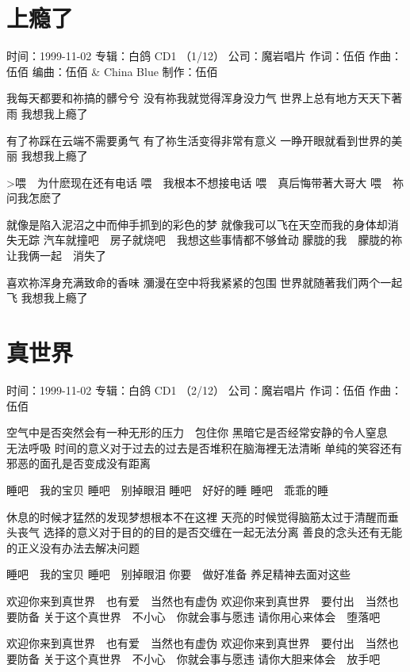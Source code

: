 \documentclass[UTF8,a4paper,oneside,twocolumn,12pt]{ctexbook}
\newcommand{\infopair}[2]{\textbullet #1：#2}
\newcommand{\zc}[1][伍佰]{\infopair{作词}{#1}}
\newcommand{\zq}[1][伍佰]{\infopair{作曲}{#1}}
\newcommand{\bq}[1][伍佰]{\infopair{编曲}{#1}}
\newcommand{\zj}[1]{\infopair{专辑}{#1}}
\newcommand{\zz}[1]{\infopair{制作}{#1}}
\newcommand{\sj}[1]{\infopair{时间}{#1}}
\newcommand{\gs}[1]{\infopair{公司}{#1}}
\newenvironment{info}{\begin{flushleft}\kaishu
	}
	{\end{flushleft}\normalsize\yahei\par}
\newenvironment{lyric}{
	}
{}
\begin{document}
\section{上瘾了}
\begin{info}
	\sj{1999-11-02}
	\zj{白鸽 CD1 （1/12）}
	\gs{魔岩唱片}
	\zc
	\zq
	\bq[伍佰 \& China Blue]
	\zz{伍佰}

\end{info}
\begin{lyric}
	我每天都要和祢搞的髒兮兮
	没有祢我就觉得浑身没力气
	世界上总有地方天天下著雨
	我想我上瘾了

	有了祢踩在云端不需要勇气
	有了祢生活变得非常有意义
	一睁开眼就看到世界的美丽
	我想我上瘾了

	>喂　为什麽现在还有电话
	喂　我根本不想接电话
	喂　真后悔带著大哥大
	喂　祢问我怎麽了

	就像是陷入泥沼之中而伸手抓到的彩色的梦
	就像我可以飞在天空而我的身体却消失无踪
	汽车就撞吧　房子就烧吧　我想这些事情都不够耸动
	朦胧的我　朦胧的祢　让我俩一起　消失了

	喜欢祢浑身充满致命的香味
	瀰漫在空中将我紧紧的包围
	世界就随著我们两个一起飞
	我想我上瘾了
\end{lyric}

\section{真世界}
\begin{info}
	\sj{1999-11-02}
	\zj{白鸽 CD1 （2/12）}
	\gs{魔岩唱片}
	\zc
	\zq
\end{info}
\begin{lyric}
	空气中是否突然会有一种无形的压力　包住你
	黑暗它是否经常安静的令人窒息　无法呼吸
	时间的意义对于过去的过去是否堆积在脑海裡无法清晰
	单纯的笑容还有邪恶的面孔是否变成没有距离

	睡吧　我的宝贝
	睡吧　别掉眼泪
	睡吧　好好的睡
	睡吧　乖乖的睡

	休息的时候才猛然的发现梦想根本不在这裡
	天亮的时候觉得脑筋太过于清醒而垂头丧气
	选择的意义对于目的的目的是否交缠在一起无法分离
	善良的念头还有无能的正义没有办法去解决问题

	睡吧　我的宝贝
	睡吧　别掉眼泪
	你要　做好准备
	养足精神去面对这些

	欢迎你来到真世界　也有爱　当然也有虚伪
	欢迎你来到真世界　要付出　当然也要防备
	关于这个真世界　不小心　你就会事与愿违
	请你用心来体会　堕落吧

	欢迎你来到真世界　也有爱　当然也有虚伪
	欢迎你来到真世界　要付出　当然也要防备
	关于这个真世界　不小心　你就会事与愿违
	请你大胆来体会　放手吧
\end{lyric}
\end{document}
